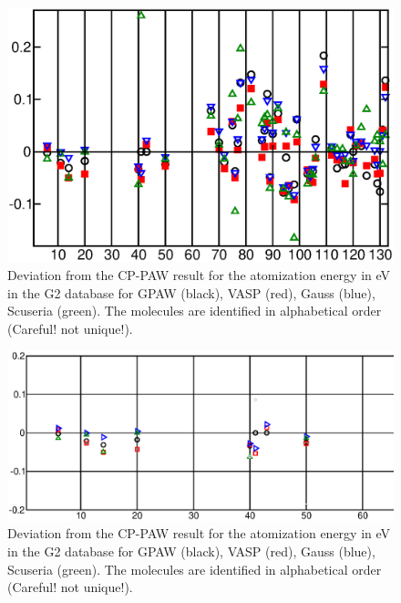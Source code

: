\documentclass[11pt,a4paper]{report}
\begin{document}
\begin{figure}[h!]
\begin{center}
\includegraphics[width=\linewidth,clip=true]{Figs/G2test/devfromcppaw.eps}
\end{center}
\caption{\label{devfromcppaw} Deviation from the CP-PAW result for the
  atomization energy in eV in the G2 database for GPAW (black), VASP
  (red), Gauss (blue), Scuseria (green). The molecules are identified
  in alphabetical order (Careful! not unique!).}
\end{figure}
\begin{figure}[h!]

\begin{center}
\includegraphics[width=\linewidth,clip=true]{Figs/G2test/devfromcppawlim.eps}
\end{center}
\caption{\label{devfromcppawlim} Deviation from the CP-PAW result for the
  atomization energy in eV in the G2 database for GPAW (black), VASP
  (red), Gauss (blue), Scuseria (green). The molecules are identified
  in alphabetical order (Careful! not unique!).}
\end{figure}
\end{document}
